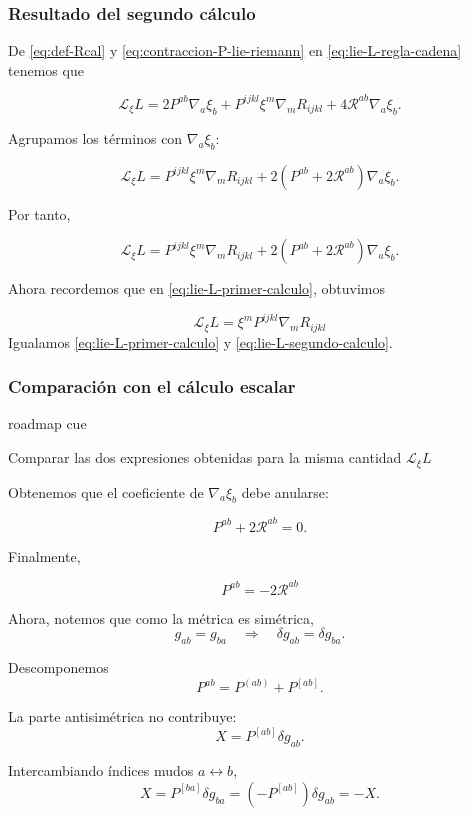 \documentclass{beamer}
\newcommand{\Lie}{\mathcal{L}}
\newcommand{\Eq}[1]{\eqref{#1}}
\newcommand{\RoadmapCue}[1]{%
    \begin{beamercolorbox}[
        wd=\textwidth,
        sep=.55ex,
        leftskip=.8ex,
        rounded=true
    ]{roadmap cue}

    \scriptsize
    \enspace #1

    \end{beamercolorbox}

    \vspace{.25em}
}
\begin{document}
\begin{frame}[label=nav-frame-015]
\frametitle{Resultado del segundo cálculo}
\small

De \Eq{eq:def-Rcal} y \Eq{eq:contraccion-P-lie-riemann} en \Eq{eq:lie-L-regla-cadena} tenemos que

\[
\mathcal L_\xi L
=
2P^{ab}\nabla_a\xi_b
+
P^{ijkl}\xi^m\nabla_mR_{ijkl}
+
4\mathcal R^{ab}\nabla_a\xi_b.
\]


Agrupamos los términos con $\nabla_a\xi_b$:

\[
\mathcal L_\xi L
=
P^{ijkl}\xi^m\nabla_mR_{ijkl}
+
2\left(P^{ab}+2\mathcal R^{ab}\right)\nabla_a\xi_b.
\]

Por tanto,

\begin{equation}
\boxed{
\mathcal L_\xi L
=
P^{ijkl}\xi^m\nabla_mR_{ijkl}
+
2\left(P^{ab}+2\mathcal R^{ab}\right)\nabla_a\xi_b.
}
\label{eq:lie-L-segundo-calculo}
\end{equation}


Ahora recordemos que en \Eq{eq:lie-L-primer-calculo}, obtuvimos

\[
\mathcal L_\xi L
=
\xi^mP^{ijkl}\nabla_mR_{ijkl}
\]
Igualamos \Eq{eq:lie-L-primer-calculo} y \Eq{eq:lie-L-segundo-calculo}.

\end{frame}

\begin{frame}[label=nav-frame-016]
\frametitle{Comparación con el cálculo escalar}
\RoadmapCue{
Comparar las dos expresiones obtenidas para la misma cantidad
$\Lie_\xi L$
}
\scriptsize

Obtenemos que el coeficiente de $\nabla_a\xi_b$ debe anularse:

\[
P^{ab}+2\mathcal R^{ab}=0.
\]

Finalmente,

\begin{equation}
\boxed{
P^{ab}=-2\mathcal R^{ab}
}
\label{eq:identidad-P-Rcal}
\end{equation}


Ahora, notemos que como la métrica es simétrica,
\[
g_{ab}=g_{ba}
\quad \Rightarrow \quad
\delta g_{ab}=\delta g_{ba}.
\]

Descomponemos
\[
P^{ab}=P^{(ab)}+P^{[ab]}.
\]


La parte antisimétrica no contribuye:
\[
X=P^{[ab]}\delta g_{ab}.
\]

Intercambiando índices mudos \(a\leftrightarrow b\),
\[
X=P^{[ba]}\delta g_{ba}
=
(-P^{[ab]})\delta g_{ab}
=
-X.
\]

\end{frame}
\end{document}
